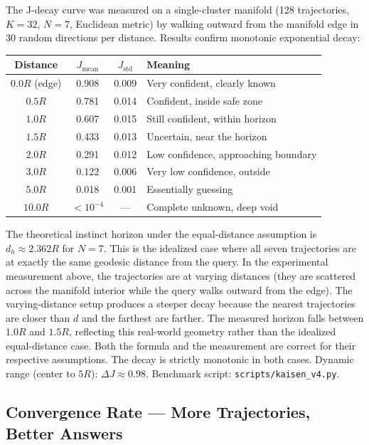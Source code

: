 \documentclass[11pt]{article}
\begin{document}
The J-decay curve was measured on a single-cluster manifold (128 trajectories, $K=32$, $N=7$, Euclidean metric) by walking outward from the manifold edge in 30 random directions per distance. Results confirm monotonic exponential decay:

\begin{center}
\begin{tabular}{c c c l}
\toprule
Distance & $J_{\text{mean}}$ & $J_{\text{std}}$ & Meaning \\
\midrule
$0.0R$ (edge) & 0.908 & 0.009 & Very confident, clearly known \\
$0.5R$ & 0.781 & 0.014 & Confident, inside safe zone \\
$1.0R$ & 0.607 & 0.015 & Still confident, within horizon \\
$1.5R$ & 0.433 & 0.013 & Uncertain, near the horizon \\
$2.0R$ & 0.291 & 0.012 & Low confidence, approaching boundary \\
$3.0R$ & 0.122 & 0.006 & Very low confidence, outside \\
$5.0R$ & 0.018 & 0.001 & Essentially guessing \\
$10.0R$ & $<10^{-4}$ & --- & Complete unknown, deep void \\
\bottomrule
\end{tabular}
\end{center}

The theoretical instinct horizon under the equal-distance assumption is $d_h \approx 2.362R$ for $N=7$. This is the idealized case where all seven trajectories are at exactly the same geodesic distance from the query. In the experimental measurement above, the trajectories are at varying distances (they are scattered across the manifold interior while the query walks outward from the edge). The varying-distance setup produces a steeper decay because the nearest trajectories are closer than $d$ and the farthest are farther. The measured horizon falls between $1.0R$ and $1.5R$, reflecting this real-world geometry rather than the idealized equal-distance case. Both the formula and the measurement are correct for their respective assumptions. The decay is strictly monotonic in both cases. Dynamic range (center to $5R$): $\Delta J \approx 0.98$. Benchmark script: \verb|scripts/kaisen_v4.py|.

\subsection{Convergence Rate — More Trajectories, Better Answers}
\end{document}
